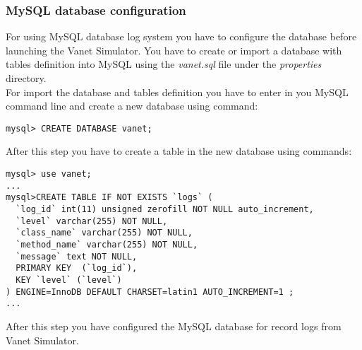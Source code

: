 \subsubsection{MySQL database configuration}
For using MySQL database log system you have to configure the database before launching the Vanet Simulator. You have to create or import a database with tables definition into MySQL using the \textit{vanet.sql} file under the \textit{properties} directory.\\
For import the database and tables definition you have to enter in you MySQL command line and create a new database using command:
\begin{verbatim}
mysql> CREATE DATABASE vanet;
\end{verbatim}
After this step you have to create a table in the new database using commands:
\begin{verbatim}
mysql> use vanet;
...
mysql>CREATE TABLE IF NOT EXISTS `logs` (
  `log_id` int(11) unsigned zerofill NOT NULL auto_increment,
  `level` varchar(255) NOT NULL,
  `class_name` varchar(255) NOT NULL,
  `method_name` varchar(255) NOT NULL,
  `message` text NOT NULL,
  PRIMARY KEY  (`log_id`),
  KEY `level` (`level`)
) ENGINE=InnoDB DEFAULT CHARSET=latin1 AUTO_INCREMENT=1 ;
...
\end{verbatim}
After this step you have configured the MySQL database for record logs from Vanet Simulator.
